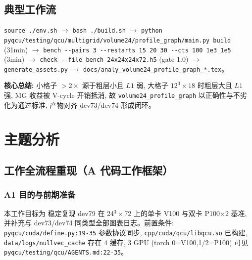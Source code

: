 \documentclass[UTF8]{ctexart}
\begin{document}
\subsection{典型工作流}
\texttt{\nolinkurl{source ./env.sh}} $\to$ \texttt{\nolinkurl{bash ./build.sh}} $\to$ \texttt{\nolinkurl{python pyqcu/testing/qcu/multigrid/volume24/profile_graph/main.py build}} (31min) $\to$ \texttt{\nolinkurl{bench --pairs 3 --restarts 15 20 30 --cts 100 1e3 1e5}} (3min) $\to$ \texttt{\nolinkurl{check --file bench_24x24x24x72.h5}} (gate 1.0) $\to$ \texttt{\nolinkurl{generate_assets.py}} $\to$ \texttt{\nolinkurl{docs/analy_volume24_profile_graph_*.tex}}。

\begin{ideabox}
\textbf{核心总结:} 小格子 $>2\times$ 源于粗层小且 $L1$ 弱, 大格子 $12^3\times18$ 时粗层大且 $L1$ 强, MG 收益被 V-cycle 开销抵消, 故 \texttt{\nolinkurl{volume24_profile_graph}} 以正确性与不劣化为通过标准, 产物对齐 dev73/dev74 形成闭环。
\end{ideabox}

\section{主题分析}
\subsection{工作全流程重现（A 代码工作框架）}

\subsubsection{A1 目的与前期准备}
本工作目标为 \textcolor{struct}{稳定复现 dev79 在 24$^3\times$72 上的单卡 V100 与双卡 P100$\times$2 基准, 并补充与 dev73/dev74 同类型全部图表日志}。前置条件: \texttt{\nolinkurl{pyqcu/cuda/define.py:19-35}} 参数协议同步, \texttt{\nolinkurl{cpp/cuda/qcu/libqcu.so}} 已构建, \texttt{\nolinkurl{data/logs/nullvec_cache}} 存在 4 缓存, 3 GPU (torch 0=V100,1/2=P100) 可见 \textcolor{evidence}{\texttt{\nolinkurl{pyqcu/testing/qcu/AGENTS.md:22-35}}}。
\end{document}
